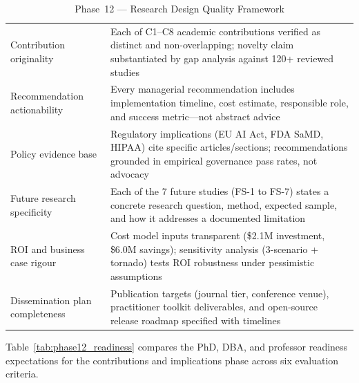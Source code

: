 \begingroup\singlespacing\tablefontsize\tablestripes
\begin{xltabular}{\textwidth}{@{} l X @{}}
\caption{Phase~12 --- Research Design Quality Framework}
\label{tab:phase12_quality}\\
\toprule
{} &  \\
\midrule
\endfirsthead
\endhead
\bottomrule
\endlastfoot
Contribution originality      & Each of C1--C8 academic contributions verified as distinct and non-overlapping; novelty claim substantiated by gap analysis against 120+ reviewed studies \\
\addlinespace
Recommendation actionability  & Every managerial recommendation includes implementation timeline, cost estimate, responsible role, and success metric---not abstract advice \\
\addlinespace
Policy evidence base           & Regulatory implications (EU AI Act, FDA SaMD, HIPAA) cite specific articles/sections; recommendations grounded in empirical governance pass rates, not advocacy \\
\addlinespace
Future research specificity    & Each of the 7 future studies (FS-1 to FS-7) states a concrete research question, method, expected sample, and how it addresses a documented limitation \\
\addlinespace
ROI and business case rigour   & Cost model inputs transparent (\$2.1M investment, \$6.0M savings); sensitivity analysis (3-scenario + tornado) tests ROI robustness under pessimistic assumptions \\
\addlinespace
Dissemination plan completeness & Publication targets (journal tier, conference venue), practitioner toolkit deliverables, and open-source release roadmap specified with timelines \\
\end{xltabular}
\endgroup

\vspace{1.5em}

Table~\ref{tab:phase12_readiness} compares the PhD, DBA, and professor readiness expectations for the contributions and implications phase across six evaluation criteria.

